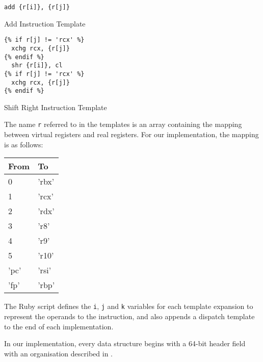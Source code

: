 		\begin{doublefig}
			\begin{halffig}
				\begin{lstlisting}
add {r[i]}, {r[j]}
				\end{lstlisting}
				\caption{Add Instruction Template}
				\label{fig:addtemplate}
			\end{halffig}
			\begin{halffig}
				\begin{lstlisting}
{% if r[j] != 'rcx' %}
  xchg rcx, {r[j]}
{% endif %}
  shr {r[i]}, cl
{% if r[j] != 'rcx' %}
  xchg rcx, {r[j]}
{% endif %}
				\end{lstlisting}
				\caption{Shift Right Instruction Template}
				\label{fig:shrtemplate}
			\end{halffig}
		\end{doublefig}
		
		The name \texttt{r} referred to in the templates is an array containing the mapping between virtual registers and real registers. For our implementation, the mapping is as follows:
		
		\begin{tabular}{|l|l|}
			\hline
			From & To \\
			\hline
			0 & 'rbx' \\
			\hline
			1 & 'rcx' \\
			\hline
			2 & 'rdx' \\
			\hline
			3 & 'r8' \\
			\hline
			4 & 'r9' \\
			\hline
			5 & 'r10' \\
			\hline
			'pc' & 'rsi' \\
			\hline
			'fp' & 'rbp' \\ 
			\hline
		\end{tabular}
		
		The Ruby script defines the \texttt{i}, \texttt{j} and \texttt{k} variables for each template expansion to represent the operands to the instruction, and also appends a dispatch template to the end of each implementation.
			
		
		In our implementation, every data structure begins with a 64-bit header field with an organisation described in . 
		
